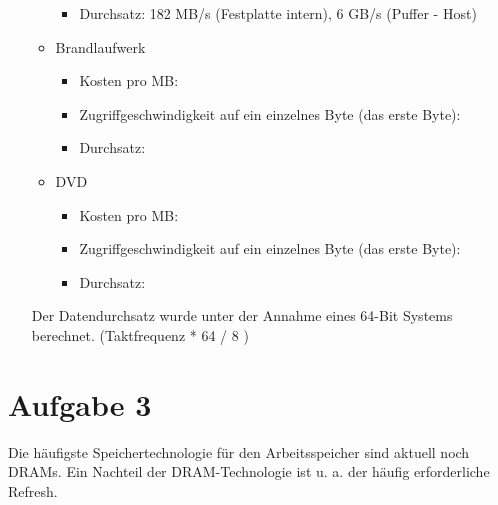 \documentclass[10pt]{article}
\begin{document}
\begin{enumerate}[label=\alph*)]
\begin{itemize}
\begin{itemize}
						\item Durchsatz: 182 MB/s (Festplatte intern), 6 GB/s (Puffer - Host)
					\end{itemize}
				\item Brandlaufwerk
					\begin{itemize}
						\item Kosten pro MB:
						\item Zugriffgeschwindigkeit auf ein einzelnes Byte (das erste Byte):
						\item Durchsatz:
					\end{itemize}
				\item DVD
					\begin{itemize}
						\item Kosten pro MB:
						\item Zugriffgeschwindigkeit auf ein einzelnes Byte (das erste Byte):
						\item Durchsatz:
					\end{itemize}
			\end{itemize}	
			Der Datendurchsatz wurde unter der Annahme eines 64-Bit Systems berechnet. (Taktfrequenz * 64 / 8 )

\end{enumerate}

\newpage
\section*{Aufgabe 3}
Die häufigste Speichertechnologie für den Arbeitsspeicher sind aktuell noch DRAMs. Ein Nachteil der DRAM-Technologie ist u. a. der häufig erforderliche Refresh.
\end{document}
